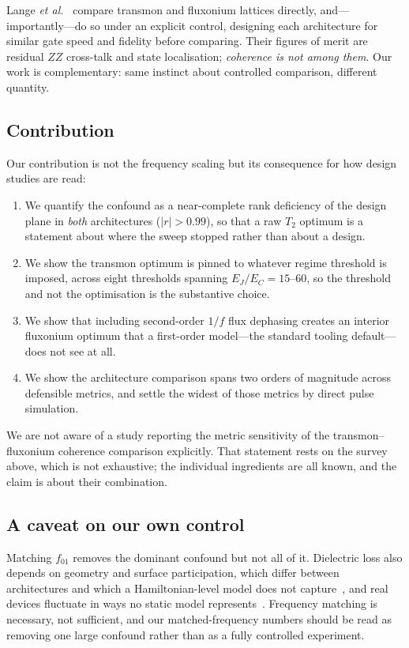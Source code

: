 \documentclass[journal]{IEEEtran}
\begin{document}
Lange \emph{et al.}~\cite{lange2025} compare transmon and fluxonium lattices directly, and---
importantly---do so under an explicit control, designing each architecture for similar gate
speed and fidelity before comparing. Their figures of merit are residual $ZZ$ cross-talk and
state localisation; \emph{coherence is not among them}. Our work is complementary: same
instinct about controlled comparison, different quantity.

\subsection{Contribution}

Our contribution is not the frequency scaling but its consequence for how design studies are
read:

\begin{enumerate}
\item We quantify the confound as a near-complete rank deficiency of the design plane in
      \emph{both} architectures ($|r| > 0.99$), so that a raw $T_2$ optimum is a statement
      about where the sweep stopped rather than about a design.
\item We show the transmon optimum is pinned to whatever regime threshold is imposed, across
      eight thresholds spanning $E_J/E_C = 15$--$60$, so the threshold and not the
      optimisation is the substantive choice.
\item We show that including second-order $1/f$ flux dephasing creates an interior fluxonium
      optimum that a first-order model---the standard tooling default---does not see at all.
\item We show the architecture comparison spans two orders of magnitude across defensible
      metrics, and settle the widest of those metrics by direct pulse simulation.
\end{enumerate}

We are not aware of a study reporting the metric sensitivity of the transmon--fluxonium
coherence comparison explicitly. That statement rests on the survey above, which is not
exhaustive; the individual ingredients are all known, and the claim is about their combination.

\subsection{A caveat on our own control}

Matching $f_{01}$ removes the dominant confound but not all of it. Dielectric loss also depends
on geometry and surface participation, which differ between architectures and which a
Hamiltonian-level model does not capture~\cite{wang2015}, and real devices fluctuate in ways
no static model represents~\cite{mcrae2021}. Frequency matching is necessary, not sufficient,
and our matched-frequency numbers should be read as removing one large confound rather than
as a fully controlled experiment.
\end{document}
